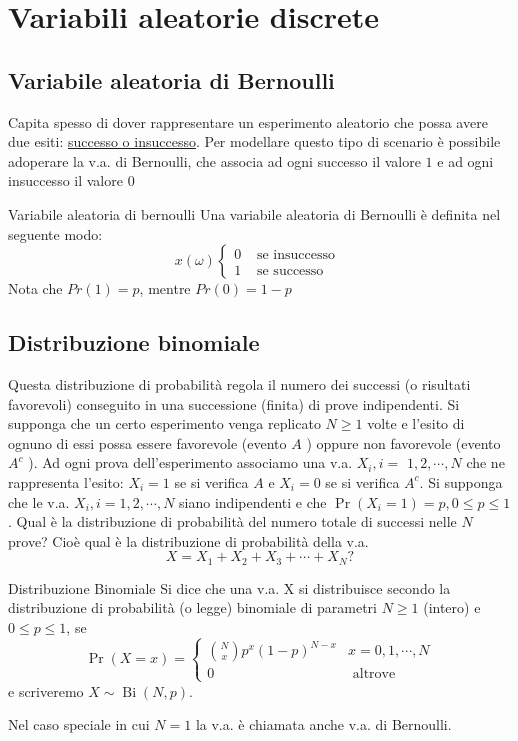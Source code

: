 \section{Variabili aleatorie discrete}
\subsection{Variabile aleatoria di Bernoulli}
Capita spesso di dover rappresentare un esperimento aleatorio che possa avere due esiti: \underline{successo o insuccesso}. Per modellare questo tipo di scenario è possibile adoperare la v.a. di Bernoulli, che associa ad ogni successo il valore $ 1 $ e ad ogni insuccesso il valore $ 0 $
\begin{definizione}{Variabile aleatoria di bernoulli}
	Una variabile aleatoria di Bernoulli è definita nel seguente modo:
	\[
		x\left(\omega \right)\begin{cases}
			0 & \text{ se insuccesso } \\
			1 & \text{ se successo }
		\end{cases}
	\]
	Nota che $ Pr\left(1\right) = p $, mentre $ Pr\left(0\right) = 1-p $
\end{definizione}
\subsection{Distribuzione binomiale}
\label{vabinomiale}

Questa distribuzione di probabilità regola il numero dei successi (o risultati favorevoli) conseguito in una successione (finita) di prove indipendenti.
Si supponga che un certo esperimento venga replicato $N \geq 1$ volte e l'esito di ognuno di essi possa essere favorevole (evento $A$ ) oppure non favorevole (evento $A^c$ ). Ad ogni prova dell'esperimento associamo una v.a. $X_i, i=$ $1,2, \cdots, N$ che ne rappresenta l'esito: $X_i=1$ se si verifica $A$ e $X_i=0$ se si verifica $A^c$. Si supponga che le v.a. $X_i, i=1,2, \cdots, N$ siano indipendenti e che $\Pr\left(X_i=1\right)=p, 0 \leq p \leq 1$. Qual è la distribuzione di probabilità del numero totale di successi nelle $N$ prove? Cioè qual è la distribuzione di probabilità della v.a.
\[
	X=X_1+X_2+X_3+\cdots+X_N ?
\]
\begin{definizione}{Distribuzione Binomiale}
	Si dice che una v.a. X si distribuisce secondo la distribuzione di probabilità (o legge) binomiale di parametri $N \geq 1$ (intero) e $ 0 \leq p \leq 1$, se
	\[
		\Pr(X=x)= \begin{cases}
			\binom{N}{x}p^x(1-p)^{N-x} & x=0,1, \cdots, N  \\
			0                          & \text { altrove }\end{cases}
	\]
	e scriveremo $X \sim \operatorname{Bi}(N, p)$.

\end{definizione}
Nel caso speciale in cui $N=1$ la v.a. è chiamata anche v.a. di Bernoulli.

